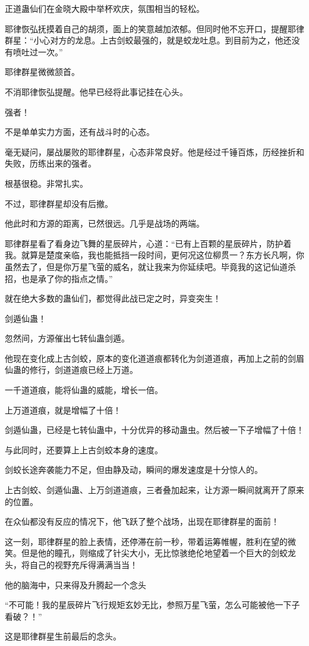 \begin{this_body}
正道蛊仙们在金晓大殿中举杯欢庆，氛围相当的轻松。

耶律恢弘抚摸着自己的胡须，面上的笑意越加浓郁。但同时他不忘开口，提醒耶律群星：“小心对方的龙息。上古剑蛟最强的，就是蛟龙吐息。到目前为之，他还没有喷吐过一次。”

耶律群星微微颔首。

不消耶律恢弘提醒。他早已经将此事记挂在心头。

强者！

不是单单实力方面，还有战斗时的心态。

毫无疑问，屡战屡败的耶律群星，心态非常良好。他是经过千锤百炼，历经挫折和失败，历练出来的强者。

根基很稳。非常扎实。

不过，耶律群星却没有后撤。

他此时和方源的距离，已然很远。几乎是战场的两端。

耶律群星看了看身边飞舞的星辰碎片，心道：“已有上百颗的星辰碎片，防护着我。就算是楚度亲临，我也能抵挡一段时间，更何况这位柳贯一？东方长凡啊，你虽然去了，但是你万星飞萤的威名，就让我来为你延续吧。毕竟我的这记仙道杀招，也是承了你的指点之情。”

就在绝大多数的蛊仙们，都觉得此战已定之时，异变突生！

剑遁仙蛊！

忽然间，方源催出七转仙蛊剑遁。

他现在变化成上古剑蛟，原本的变化道道痕都转化为剑道道痕，再加上之前的剑眉仙蛊的修行，剑道道痕已经上万道。

一千道道痕，能将仙蛊的威能，增长一倍。

上万道道痕，就是增幅了十倍！

剑遁仙蛊，已经是七转仙蛊中，十分优异的移动蛊虫。然后被一下子增幅了十倍！

与此同时，还要算上上古剑蛟本身的速度。

剑蛟长途奔袭能力不足，但由静及动，瞬间的爆发速度是十分惊人的。

上古剑蛟、剑遁仙蛊、上万剑道道痕，三者叠加起来，让方源一瞬间就离开了原来的位置。

在众仙都没有反应的情况下，他飞跃了整个战场，出现在耶律群星的面前！

这一刻，耶律群星的脸上表情，还停滞在前一秒，带着运筹帷幄，胜利在望的微笑。但是他的瞳孔，则缩成了针尖大小，无比惊骇绝伦地望着一个巨大的剑蛟龙头，将自己的视野充斥得满满当当！

他的脑海中，只来得及升腾起一个念头

“不可能！我的星辰碎片飞行规矩玄妙无比，参照万星飞萤，怎么可能被他一下子看破？！”

这是耶律群星生前最后的念头。

\end{this_body}

